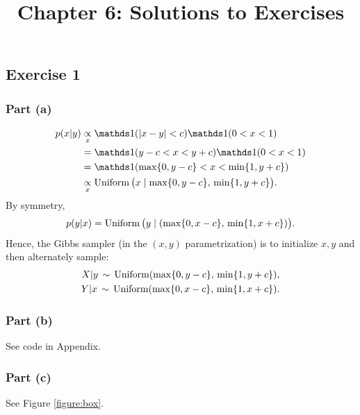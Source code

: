 \documentclass[12pt]{article}
\title{Chapter 6: Solutions to Exercises}
\author{}
\date{}
\begin{document}
\maketitle
\thispagestyle{firststyle}


\subsection*{Exercise 1}

\subsubsection*{Part (a)}
\begin{align*}
    p(x|y) &\underset{x}{\propto} \I(|x-y|<c)\I(0<x<1)\\
        &= \I(y-c<x<y+c)\I(0<x<1)\\
        &= \I(\max\{0,y-c\}<x<\min\{1,y+c\})\\
        &\underset{x}{\propto} \Uniform\big(x\mid \max\{0,y-c\},\,\min\{1,y+c\}\big).
\end{align*}
By symmetry,
$$ p(y|x) = \operatorname*{Uniform}\big(y\mid (\max\{0,x-c\},\,\min\{1,x+c\})\big). $$
Hence, the Gibbs sampler (in the $(x,y)$ parametrization) is to initialize $x,y$ and then alternately sample:
\begin{align*}
     X|y\,\sim\,\operatorname*{Uniform}(\max\{0,y-c\},\,\min\{1,y+c\}),\\
     Y|x\,\sim\,\operatorname*{Uniform}(\max\{0,x-c\},\,\min\{1,x+c\}).
\end{align*}

\subsubsection*{Part (b)}
See code in Appendix.

\subsubsection*{Part (c)}
See Figure \ref{figure:box}.
\end{document}
